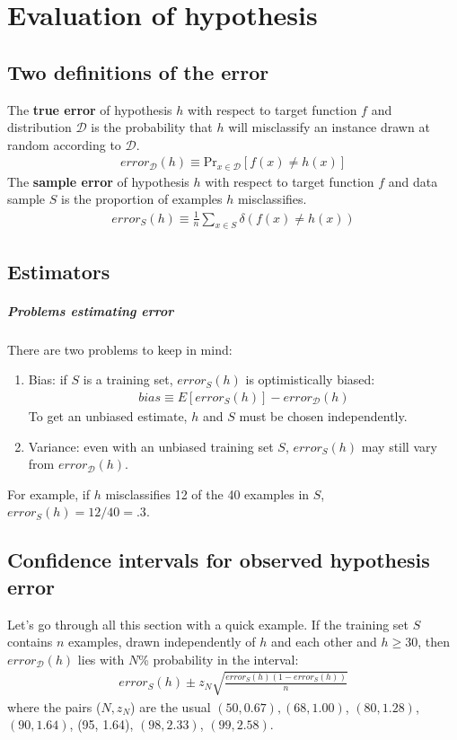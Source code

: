 
\chapter{Evaluation of hypothesis}
\section{Two definitions of the error}
The \textbf{true error} of hypothesis $h$ with respect to target function $f$ and distribution $\mathcal{D}$ is the probability that $h$ will misclassify an instance drawn at random according to $\mathcal{D}$.
\begin{eqnarray}
error_{\mathcal{D}}(h) \equiv \text{Pr}  _{x \in \mathcal{D}}  [ f(x) \neq h(x) ]	
\end{eqnarray}
The \textbf{sample error} of hypothesis $h$ with respect to target function $f$ and data sample $S$ is the proportion of examples $h$ misclassifies.
\begin{eqnarray}
error_{S}(h) \equiv \frac{1}{n} \sum_{x \in S} \delta (f(x) \neq h(x))	
\end{eqnarray}

\section{Estimators}
\paragraph{Problems estimating error} There are two problems to keep in mind:
\begin{enumerate}
	\item Bias: if $S$ is a training set, $error_S(h)$ is optimistically biased:
	\begin{eqnarray}
		bias \equiv E [error_S(h)] - error_{\mathcal{D}}(h)
	\end{eqnarray}
	To get an unbiased estimate, $h$ and $S$ must be chosen independently.
	\item Variance: even with an unbiased training set $S$, $error_S(h)$ may still vary from $error_{\mathcal{D}}(h)$.
\end{enumerate}
For example, if $h$ misclassifies 12 of the 40 examples in $S$, $error_S(h) = 12/40 = .3$.
\section{Confidence intervals for observed hypothesis error}
Let's go through all this section with a quick example. If the training set $S$ contains $n$ examples, drawn independently of $h$ and each other and $h \geq 30$, then $error_\mathcal{D}(h)$ lies with $N$\% probability in the interval:
\begin{eqnarray}
	error_S(h) \pm z_N \sqrt{\frac{error_S(h)(1 - error_S(h))}{n}}
\end{eqnarray}  
where the pairs ($N, z_N$) are the usual $(50, 0.67), (68, 1.00)$, $(80, 1.28)$, $(90, 1.64)$, (95, 1.64), $(98, 2.33)$, $(99, 2.58)$.
